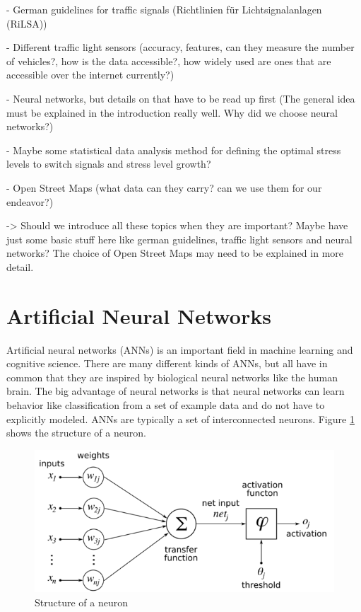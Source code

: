 - German guidelines for traffic signals (Richtlinien für Lichtsignalanlagen (RiLSA))

- Different traffic light sensors (accuracy, features, can they measure the number of vehicles?, how is the data accessible?, how widely used are ones that are accessible over the internet currently?)

- Neural networks, but details on that have to be read up first (The general idea must be explained in the introduction really well. Why did we choose neural networks?)

- Maybe some statistical data analysis method for defining the optimal stress levels to switch signals and stress level growth?

- Open Street Maps (what data can they carry? can we use them for our endeavor?)

-> Should we introduce all these topics when they are important? Maybe have just some basic stuff here like german guidelines, traffic light sensors and neural networks? The choice of Open Street Maps may need to be explained in more detail.

\newpage

\section{Artificial Neural Networks}

Artificial neural networks (ANNs) is an important field in machine learning and cognitive science. There are many different kinds of ANNs, but all have in common that they are inspired by biological neural networks like the human brain. The big advantage of neural networks is that neural networks can learn behavior like classification from a set of example data and do not have to explicitly modeled. ANNs are typically a set of interconnected neurons. Figure \ref{neuron} shows the structure of a neuron.

\begin{figure}[ht]
	\centering
  \includegraphics[scale=0.6]{figures/neuron_structure.png}
	\caption[Structure of a neuron]{Structure of a neuron \protect\footnotemark}
	\label{neuron}
\end{figure}

